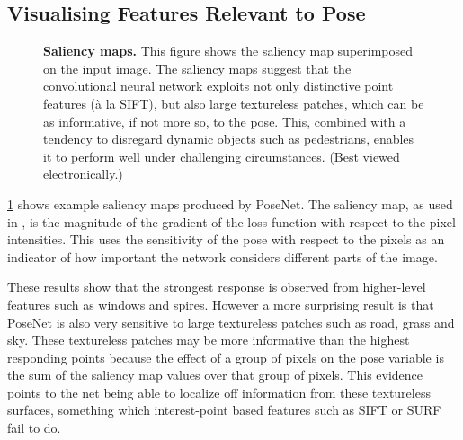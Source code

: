 \subsection{Visualising Features Relevant to Pose}

\begin{figure}[t]
   \caption[Saliency maps.]{\textbf{Saliency maps.} This figure shows the saliency map superimposed on the input image. The saliency maps suggest that the convolutional neural network exploits not only distinctive point features (\`{a} la SIFT), but also large textureless patches, which can be as informative, if not more so, to the pose. This, combined with a tendency to disregard dynamic objects such as pedestrians, enables it to perform well under challenging circumstances. (Best viewed electronically.)}
\label{fig:saliency}
\end{figure}

\cref{fig:saliency} shows example saliency maps produced by PoseNet. The saliency map, as used in \citep{simonyan2013deep}, is the magnitude of the gradient of the loss function with respect to the pixel intensities. This uses the sensitivity of the pose with respect to the pixels as an indicator of how important the network considers different parts of the image.

These results show that the strongest response is observed from higher-level features such as windows and spires. However a more surprising result is that PoseNet is also very sensitive to large textureless patches such as road, grass and sky. These textureless patches may be more informative than the highest responding points because the effect of a group of pixels on the pose variable is the sum of the saliency map values over that group of pixels. This evidence points to the net being able to localize off information from these textureless surfaces, something which interest-point based features such as SIFT or SURF fail to do.

